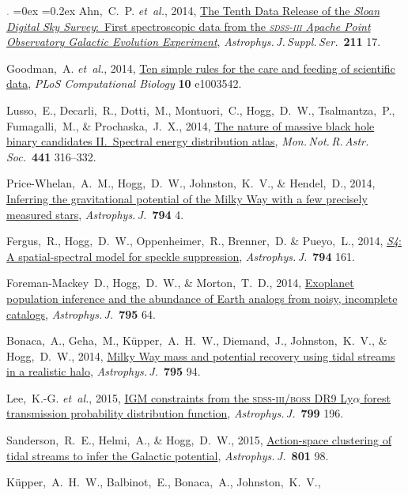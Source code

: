 \documentclass[12pt,letterpaper]{article}
\newcommand{\latin}[1]{\textsl{#1}}
\newcommand{\etal}{\latin{et~al.}}
\newcommand{\project}[1]{\textsl{#1}}
\newcommand{\doi}[2]{\href{http://dx.doi.org/#1}{{#2}}}
\newcommand{\deemph}[1]{\textcolor{grey}{\footnotesize{#1}}}
\newcommand{\pubnumber}[1]{\deemph{{#1}.}}
\newcounter{refpubnum}
\newcommand{\hogglist}{%
    \rightmargin=0in
    \leftmargin=0.18in
    \topsep=0ex
    \partopsep=0pt
    \itemsep=0.2ex
    \parsep=0pt
    \itemindent=-1.0\leftmargin
    \listparindent=0.0\leftmargin
    \settowidth{\labelsep}{~}
    \usecounter{refpubnum}
  }
\begin{document}
\begin{list}{\pubnumber{\therefpubnum}}{\hogglist}
Ahn,~C.~P. \etal, 2014,
\doi{10.1088/0067-0049/211/2/17}{The Tenth Data Release of the \project{Sloan Digital Sky Survey}:\ First spectroscopic data from the \project{\textsc{sdss-iii} Apache Point Observatory Galactic Evolution Experiment}},
\textit{Astrophys.\,J.\,Suppl.\,Ser.}\ \textbf{211} 17.
\item
Goodman,~A. \etal, 2014,
\doi{10.1371/journal.pcbi.1003542}{Ten simple rules for the care and feeding of scientific data},
\textit{PLoS Computational Biology} \textbf{10} e1003542.
\item
Lusso,~E., Decarli,~R., Dotti,~M., Montuori,~C., Hogg,~D.~W.,
Tsalmantza,~P., Fumagalli,~M., \& Prochaska,~J.~X., 2014,
\doi{10.1093/mnras/stu572}{The nature of massive black hole binary candidates II.\ Spectral energy distribution atlas},
\textit{Mon.\,Not.\,R.\,Astr.\,Soc.}\ \textbf{441} 316--332.
\item
Price-Whelan,~A.~M., Hogg,~D.~W., Johnston,~K.~V., \& Hendel,~D., 2014,
\doi{10.1088/0004-637X/794/1/4}{Inferring the gravitational potential of the Milky Way with a few precisely measured stars},
\textit{Astrophys.\,J.}\ \textbf{794} 4.
\item
Fergus,~R., Hogg,~D.~W., Oppenheimer,~R., Brenner,~D. \& Pueyo,~L., 2014,
\doi{10.1088/0004-637X/794/2/161}{\project{S4}: A spatial-spectral model for speckle suppression},
\textit{Astrophys.\,J.}\ \textbf{794} 161.
\item
Foreman-Mackey~D., Hogg,~D.~W., \& Morton,~T.~D., 2014,
\doi{10.1088/0004-637X/795/1/64}{Exoplanet population inference and the abundance of Earth analogs from noisy, incomplete catalogs},
\textit{Astrophys.\,J.}\ \textbf{795} 64.
\item
Bonaca,~A., Geha,~M., K\"upper,~A.~H.~W., Diemand,~J., Johnston,~K.~V., \& Hogg,~D.~W., 2014,
\doi{10.1088/0004-637X/795/1/94}{Milky Way mass and potential recovery using tidal streams in a realistic halo},
\textit{Astrophys.\,J.}\ \textbf{795} 94.
\item 
Lee,~K.-G. \etal, 2015,
\doi{10.1088/0004-637X/799/2/196}{IGM constraints from the \textsc{sdss-iii/boss}
DR9 Ly{$\alpha$} forest transmission probability distribution function},
\textit{Astrophys.\,J.}\ \textbf{799} 196.
\item
Sanderson,~R.~E., Helmi,~A., \& Hogg,~D.~W., 2015,
\doi{10.1088/0004-637X/801/2/98}{Action-space clustering of tidal streams
to infer the Galactic potential},
\textit{Astrophys.\,J.}\ \textbf{801} 98.
\item
K\"upper,~A.~H.~W., Balbinot,~E., Bonaca,~A., Johnston,~K.~V.,

\end{list}
\end{document}
